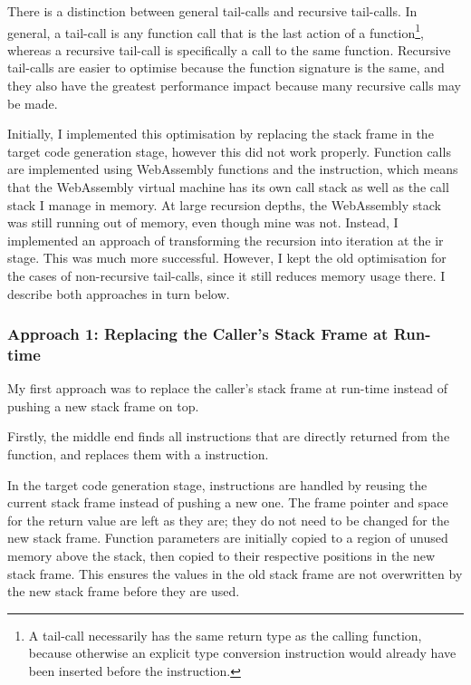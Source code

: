 \documentclass[00-main.tex]{subfiles}
\begin{document}
There is a distinction between general tail-calls and recursive tail-calls. In general, a tail-call is any function call that is the last action of a function\footnote{A tail-call necessarily has the same return type as the calling function, because otherwise an explicit type conversion instruction would already have been inserted before the  instruction.}, whereas a recursive tail-call is specifically a call to the same function.
Recursive tail-calls are easier to optimise because the function signature is the same, and they also have the greatest performance impact because many recursive calls may be made.

Initially, I implemented this optimisation by replacing the stack frame in the target code generation stage, however this did not work properly.
Function calls are implemented using WebAssembly functions and the  instruction, which means that the WebAssembly virtual machine has its own call stack as well as the call stack I manage in memory.
At large recursion depths, the WebAssembly stack was still running out of memory, even though mine was not.
Instead, I implemented an approach of transforming the recursion into iteration at the \gls{ir} stage.
This was much more successful.
However, I kept the old optimisation for the cases of non-recursive tail-calls, since it still reduces memory usage there.
I describe both approaches in turn below.

\subsubsection{Approach 1: Replacing the Caller's Stack Frame at Run-time}

My first approach was to replace the caller's stack frame at run-time instead of pushing a new stack frame on top.

Firstly, the middle end finds all  instructions that are directly returned from the function, and replaces them with a  instruction.

In the target code generation stage,  instructions are handled by reusing the current stack frame instead of pushing a new one.
The frame pointer and space for the return value are left as they are; they do not need to be changed for the new stack frame.
Function parameters are initially copied to a region of unused memory above the stack, then copied to their respective positions in the new stack frame. This ensures the values in the old stack frame are not overwritten by the new stack frame before they are used.
\end{document}
